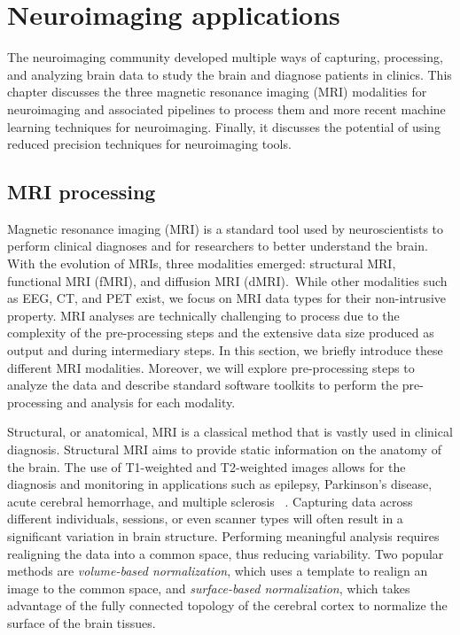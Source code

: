 \chapter{Neuroimaging applications}
\label{ch:neuroimaging}
The neuroimaging community developed multiple ways of capturing, processing, and 
analyzing brain data to study the brain and diagnose patients in clinics.
This chapter discusses the three magnetic resonance imaging (MRI) modalities for 
neuroimaging and associated pipelines to process them and more recent machine learning techniques for neuroimaging.
Finally, it discusses the potential of using reduced precision techniques for neuroimaging tools.

\section{MRI processing}
\label{sc:preprocessing}
Magnetic resonance imaging (MRI) is a standard tool used by neuroscientists to
perform clinical diagnoses and for researchers to better understand the brain. 
With the evolution of MRIs, three modalities emerged: structural MRI,
functional MRI (fMRI), and diffusion MRI (dMRI).\
While other modalities such as EEG, CT, and PET exist, we focus on MRI data types
for their non-intrusive property.
MRI analyses are technically challenging to process due to the complexity of the
pre-processing steps and the extensive data size produced as output and during intermediary steps.
In this section, we briefly introduce these different MRI modalities.
Moreover, we will explore pre-processing steps to analyze the data and
describe standard software toolkits to perform the pre-processing and analysis for
each modality.

Structural, or anatomical, MRI is a classical method that is vastly used in clinical diagnosis.
Structural MRI aims to provide static information on the anatomy of the brain.
The use of T1-weighted and T2-weighted images allows for the diagnosis and
monitoring in applications such as epilepsy, Parkinson's disease, acute cerebral
hemorrhage, and multiple sclerosis ~\cite{Symms2004-xj}.
Capturing data across different individuals, sessions, or even scanner types will often result in a significant variation in brain structure. 
Performing meaningful analysis requires realigning the data into a common space, thus reducing variability.
Two popular methods are \textit{volume-based normalization}, which uses a
template to realign an image to the common space, and \textit{surface-based normalization},
which takes advantage of the fully connected topology of the cerebral cortex to
normalize the surface of the brain tissues.

